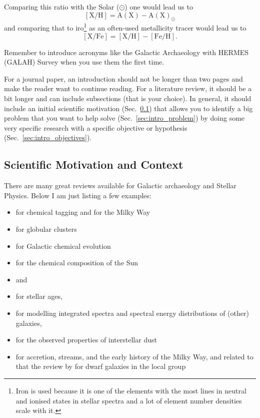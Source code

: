 \documentclass[fleqn,usenatbib]{mnras}
\begin{document}
Comparing this ratio with the Solar ($\odot$) one would lead us to 
\begin{equation}
\mathrm{[X/H]} = \mathrm{A(X)} - \mathrm{A(X)}_\odot    
\end{equation}
and comparing that to iro\footnote{Iron is used because it is one of the elements with the most lines in neutral and ionised states in stellar spectra and a lot of element number densities scale with it.} as an often-used metallicity tracer would lead us to
\begin{equation}
\mathrm{[X/Fe]} = \mathrm{[X/H]} - \mathrm{[Fe/H]}.
\end{equation}

Remember to introduce acronyms like the Galactic Archaeology with HERMES (GALAH) Survey when you use them the first time.

For a journal paper, an introduction should not be longer than two pages and make the reader want to continue reading. For a literature review, it should be a bit longer and can include subsections (that is your choice). In general, it should include an initial scientific motivation (Sec.~\ref{sec:intro_motivation}) that allows you to identify a big problem that you want to help solve (Sec.~\ref{sec:intro_problem}) by doing some very specific research with a specific objective or hypothesis (Sec.~\ref{sec:intro_objectives}).

\subsection{Scientific Motivation and Context} \label{sec:intro_motivation}

There are many great reviews available for Galactic archaeology and Stellar Physics. Below I am just listing a few examples:
\begin{itemize}
    \item \citet{FreemanBlandHawthorn2002} for chemical tagging and \citet{BlandHawthorn_Gerhard2016} for the Milky Way
    \item \citet{Bastian2018} for globular clusters
    \item \citet{McWilliam1997} for Galactic chemical evolution
    \item \citet{Asplund2009} for the chemical composition of the Sun
    \item \citet{Jofre2019} and 
    \item \citet{Soderblom2010} for stellar ages,
    \item \citet{Conroy2013} for modelling integrated spectra and spectral energy distributions of (other) galaxies,
    \item \citet{Savage1979} for the observed properties of interstellar dust
    \item \citet{Helmi2020} for accretion, streams, and the early history of the Milky Way, and related to that the review by \citet{Tolstoy2009} for dwarf galaxies in the local group
\end{itemize}
\end{document}
